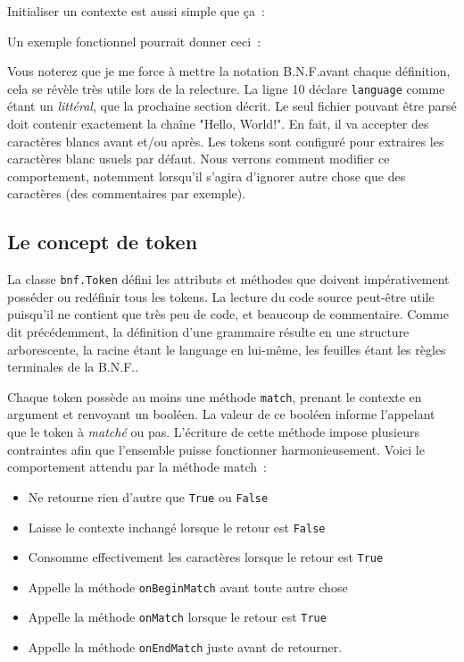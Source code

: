 \documentclass[a4paper]{article}
\newcommand{\insertpython}[1]{%
{\ttfamily}%
}
\newcommand{\fixed}[1]{\texttt{#1}}
\newcommand{\bnf}{B.N.F.}
\begin{document}
            Initialiser un contexte est aussi simple que ça~:
            \insertpython{listings/bnf/ex00.py}

            Un exemple fonctionnel pourrait donner ceci~:
            \insertpython{listings/bnf/ex01.py}

            Vous noterez que je me force à mettre la notation \bnf avant chaque
            définition, cela se révèle très utile lors de la relecture. La ligne 10
            déclare \fixed{language} comme étant un \emph{littéral}, que la
            prochaine section décrit. Le seul fichier pouvant être parsé doit
            contenir exactement la chaîne "Hello, World!". En fait, il va
            accepter des caractères blancs avant et/ou après. Les tokens sont
            configuré pour extraires les caractères blanc usuels par défaut.
            Nous verrons comment modifier ce comportement, notemment lorsqu'il
            s'agira d'ignorer autre chose que des caractères (des commentaires
            par exemple).

        \subsection{Le concept de token}
            La classe \fixed{bnf.Token} défini les attributs et méthodes que
            doivent impérativement posséder ou redéfinir tous les tokens.
            La lecture du code source peut-être utile puisqu'il ne contient
            que très peu de code, et beaucoup de commentaire.
            Comme dit précédemment, la définition
            d'une grammaire résulte en une structure arborescente, la racine
            étant le language en lui-même, les feuilles étant les règles
            terminales de la \bnf.

            Chaque token possède au moins une méthode \fixed{match}, prenant
            le contexte en argument et renvoyant un booléen. La valeur de ce booléen
            informe l'appelant que le token à \emph{matché} ou pas. L'écriture de
            cette méthode impose plusieurs contraintes afin que l'ensemble puisse
            fonctionner harmonieusement.
            Voici le comportement attendu par la méthode match~:
            \begin{itemize}
                \item Ne retourne rien d'autre que \fixed{True} ou \fixed{False}
                \item Laisse le contexte inchangé lorsque le retour est \fixed{False}
                \item Consomme effectivement les caractères lorsque le retour est \fixed{True}
                \item Appelle la méthode \fixed{onBeginMatch} avant toute autre chose
                \item Appelle la méthode \fixed{onMatch} lorsque le retour est \fixed{True}
                \item Appelle la méthode \fixed{onEndMatch} juste avant de retourner.
            \end{itemize}
\end{document}
